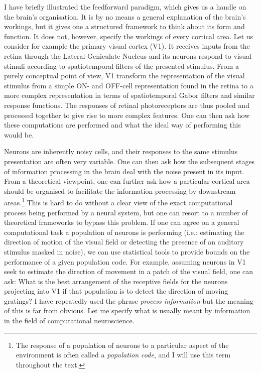 I have briefly illustrated the feedforward paradigm, which gives us a handle on the brain's organisation. It is by no means a general explanation of the brain's workings,
but it gives one a structured framework to think about its form and function. It does not, however, specify the workings of every cortical area. Let us consider for example
the primary visual cortex (V1). It receives inputs from the retina through the Lateral Geniculate Nucleus and its neurons respond to visual stimuli according to spatiotemporal filters of
the presented stimulus. From a purely conceptual point of view, V1 transform the representation of the visual stimulus from a simple ON- and OFF-cell representation found
in the retina to a more complex representation in terms of spatiotemporal Gabor filters and similar response functions. The responses of retinal photoreceptors are thus
pooled and processed together to give rise to more complex features. One can then ask how these computations are performed and what the ideal way of
performing this would be.
\par

Neurons are inherently noisy cells, and their responses to the same stimulus presentation are often very variable. 
One can then ask how the subsequent stages of information processing in the brain
deal with the noise present in its input. From a theoretical viewpoint, one can further ask how a particular cortical area should be organised to facilitate the information processing by
downstream areas.\footnote{The response of a population of neurons to a particular aspect of the environment is often called a 
\emph{population code}, and I will use this term throughout the text.}
This is hard to do without a clear view of the exact computational process being performed by a neural system, but one
can resort to a number of theoretical frameworks to bypass this problem. If one can agree on a general computational task a population of neurons is performing (i.e.:
estimating the direction of motion of the visual field or detecting the presence of an auditory stimulus masked in noise), we can use statistical tools to provide bounds on 
the performance of a given population code. For example, assuming neurons in V1 seek to estimate the direction of movement in a patch of the visual field, one can ask:
What is the best arrangement of the receptive fields for the neurons projecting into V1 if that population is to detect the direction of moving gratings?
I have repeatedly used the phrase \emph{process information} but the meaning of this is far from obvious. Let me specify what is usually meant by information
in the field of computational neuroscience.
\par

